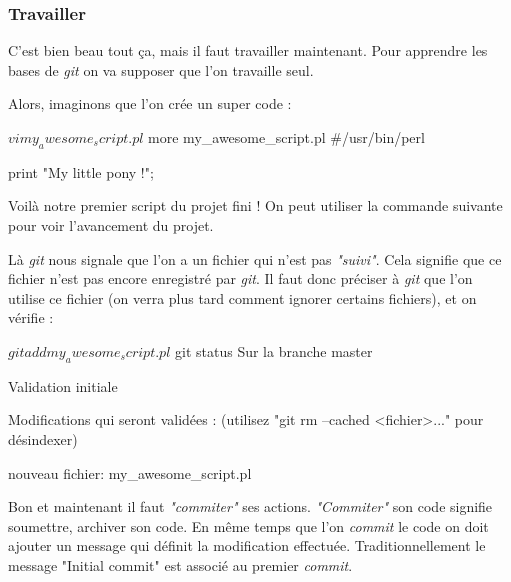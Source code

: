 \documentclass[12pt,a4paper]{article}
\begin{document}
\subsubsection{Travailler}

C'est bien beau tout ça, mais il faut travailler maintenant. Pour apprendre les bases de \emph{git} on va supposer que l'on travaille seul.

Alors, imaginons que l'on crée un super code :

{
\begin{boxedverbatim}
$ vi my_awesome_script.pl
$ more my_awesome_script.pl
#/usr/bin/perl

print "My little pony !\n";
\end{boxedverbatim}
}

Voilà notre premier script du projet fini ! On peut utiliser la commande suivante pour voir l'avancement du projet.

{
}

Là \emph{git} nous signale que l'on a un fichier qui n'est pas \emph{"suivi"}. Cela signifie que ce fichier n'est pas encore enregistré par \emph{git}. Il faut donc préciser à \emph{git} que l'on utilise ce fichier (on verra plus tard comment ignorer certains fichiers), et on vérifie :

{
\begin{boxedverbatim}
$ git add my_awesome_script.pl 
$ git status
Sur la branche master

Validation initiale

Modifications qui seront validées :
  (utilisez "git rm --cached <fichier>..." pour désindexer)

	nouveau fichier: my_awesome_script.pl
\end{boxedverbatim}
}

Bon et maintenant il faut \emph{"commiter"} ses actions. \emph{"Commiter"} son code signifie soumettre, archiver son code. En même temps que l'on \emph{commit} le code on doit ajouter un message qui définit la modification effectuée. Traditionnellement le message "Initial commit" est associé au premier \emph{commit}.
\end{document}
